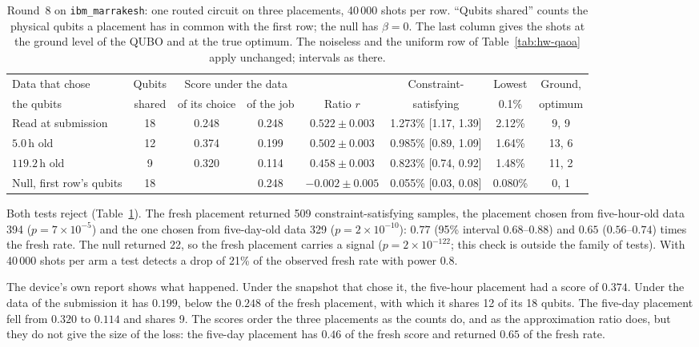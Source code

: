 \documentclass[11pt,a4paper]{article}
\begin{document}
\begin{table}[H]
\centering\footnotesize\setlength{\tabcolsep}{3pt}
\begin{tabular}{lccccccc}
\toprule
Data that chose & Qubits & \multicolumn{2}{c}{Score under the data} & & Constraint- & Lowest & Ground, \\
the qubits & shared & of its choice & of the job & Ratio $r$ & satisfying & 0.1\% & optimum \\
\midrule
Read at submission & 18 & 0.248 & 0.248 & $0.522 \pm 0.003$ & 1.273\% [1.17, 1.39] & 2.12\% & 9, 9 \\
$5.0$\,h old & 12 & 0.374 & 0.199 & $0.502 \pm 0.003$ & 0.985\% [0.89, 1.09] & 1.64\% & 13, 6 \\
$119.2$\,h old & 9 & 0.320 & 0.114 & $0.458 \pm 0.003$ & 0.823\% [0.74, 0.92] & 1.48\% & 11, 2 \\
Null, first row's qubits & 18 & & 0.248 & $-0.002 \pm 0.005$ & 0.055\% [0.03, 0.08] & 0.080\% & 0, 1 \\
\bottomrule
\end{tabular}
\caption{Round~8 on \texttt{ibm\_marrakesh}: one routed circuit on three
placements, 40\,000 shots per row. ``Qubits shared'' counts the physical
qubits a placement has in common with the first row; the null has
$\beta = 0$. The last column gives the shots at the ground level of the QUBO
and at the true optimum. The noiseless and the
uniform row of Table~\ref{tab:hw-qaoa} apply unchanged; intervals as there.}
\label{tab:hw-stale}
\end{table}

Both tests reject (Table~\ref{tab:hw-stale}). The fresh placement returned
509 constraint-satisfying samples, the placement chosen from five-hour-old
data 394 ($p = 7\times10^{-5}$) and the one chosen from five-day-old data
329 ($p = 2\times10^{-10}$): $0.77$ (95\% interval $0.68$--$0.88$) and
$0.65$ ($0.56$--$0.74$) times the fresh rate. The null returned 22, so the
fresh placement carries a signal ($p = 2\times10^{-122}$; this check is
outside the family of tests). With 40\,000 shots per arm a test detects a
drop of 21\% of the observed fresh rate with power $0.8$.

The device's own report shows what happened. Under the snapshot that chose
it, the five-hour placement had a score of $0.374$. Under the data of the
submission it has $0.199$, below the $0.248$ of the fresh placement, with
which it shares 12 of its 18 qubits. The five-day placement fell from
$0.320$ to $0.114$ and shares 9. The scores order the three placements as
the counts do, and as the approximation ratio does, but they do not give
the size of the loss: the five-day placement has $0.46$ of the fresh score
and returned $0.65$ of the fresh rate.
\end{document}
